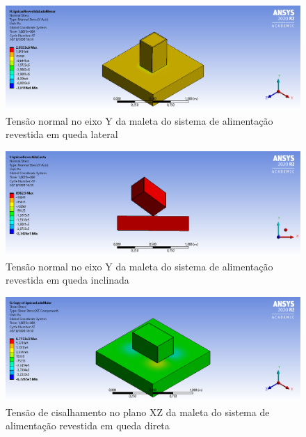 \begin{apendicesenv}
\begin{figure}[htb]
    \centering
    \includegraphics[width=1.0\textwidth, angle=0]{figuras/estrutura_simulacaoImpacto/ignicaoRevestidaNormalYMenor.png}
    \caption{Tensão normal no eixo Y da maleta do sistema de alimentação revestida em queda lateral}
    \label{fig:simulacaoImpacto_11}
\end{figure}

\begin{figure}[htb]
    \centering
    \includegraphics[width=1.0\textwidth, angle=0]{figuras/estrutura_simulacaoImpacto/ignicaoRevestidaNormalYCanto.png}
    \caption{Tensão normal no eixo Y da maleta do sistema de alimentação revestida em queda inclinada}
    \label{fig:simulacaoImpacto_12}
\end{figure}

\begin{figure}[htb]
    \centering
    \includegraphics[width=1.0\textwidth, angle=0]{figuras/estrutura_simulacaoImpacto/ignicaoRevestidaCisalhamentoXZMaior.png}
    \caption{Tensão de cisalhamento no plano XZ da maleta do sistema de alimentação revestida em queda direta}
    \label{fig:simulacaoImpacto_13}
\end{figure}


\end{apendicesenv}
